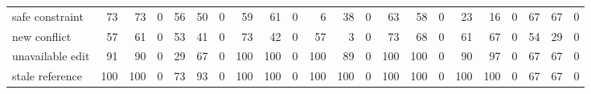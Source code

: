 \begin{tabular}{lrrrrrrrrrrrrrrrrrrrrr}
safe constraint & \cellcolor[gray]{0.74}73 & \cellcolor[gray]{0.74}73 & \cellcolor[gray]{1.00}0 & \cellcolor[gray]{0.81}56 & \cellcolor[gray]{0.82}50 & \cellcolor[gray]{1.00}0 & \cellcolor[gray]{0.79}59 & \cellcolor[gray]{0.79}61 & \cellcolor[gray]{1.00}0 & \cellcolor[gray]{0.98}6 & \cellcolor[gray]{0.87}38 & \cellcolor[gray]{1.00}0 & \cellcolor[gray]{0.78}63 & \cellcolor[gray]{0.80}58 & \cellcolor[gray]{1.00}0 & \cellcolor[gray]{0.92}23 & \cellcolor[gray]{0.95}16 & \cellcolor[gray]{1.00}0 & \cellcolor[gray]{0.77}67 & \cellcolor[gray]{0.77}67 & \cellcolor[gray]{1.00}0 \\
new conflict & \cellcolor[gray]{0.80}57 & \cellcolor[gray]{0.79}61 & \cellcolor[gray]{1.00}0 & \cellcolor[gray]{0.81}53 & \cellcolor[gray]{0.86}41 & \cellcolor[gray]{1.00}0 & \cellcolor[gray]{0.74}73 & \cellcolor[gray]{0.85}42 & \cellcolor[gray]{1.00}0 & \cellcolor[gray]{0.80}57 & \cellcolor[gray]{0.99}3 & \cellcolor[gray]{1.00}0 & \cellcolor[gray]{0.74}73 & \cellcolor[gray]{0.76}68 & \cellcolor[gray]{1.00}0 & \cellcolor[gray]{0.79}61 & \cellcolor[gray]{0.77}67 & \cellcolor[gray]{1.00}0 & \cellcolor[gray]{0.81}54 & \cellcolor[gray]{0.90}29 & \cellcolor[gray]{1.00}0 \\
unavailable edit & \cellcolor[gray]{0.68}91 & \cellcolor[gray]{0.69}90 & \cellcolor[gray]{1.00}0 & \cellcolor[gray]{0.90}29 & \cellcolor[gray]{0.77}67 & \cellcolor[gray]{1.00}0 & \cellcolor[gray]{0.65}100 & \cellcolor[gray]{0.65}100 & \cellcolor[gray]{1.00}0 & \cellcolor[gray]{0.65}100 & \cellcolor[gray]{0.69}89 & \cellcolor[gray]{1.00}0 & \cellcolor[gray]{0.65}100 & \cellcolor[gray]{0.65}100 & \cellcolor[gray]{1.00}0 & \cellcolor[gray]{0.69}90 & \cellcolor[gray]{0.66}97 & \cellcolor[gray]{1.00}0 & \cellcolor[gray]{0.77}67 & \cellcolor[gray]{0.77}67 & \cellcolor[gray]{1.00}0 \\
stale reference & \cellcolor[gray]{0.65}100 & \cellcolor[gray]{0.65}100 & \cellcolor[gray]{1.00}0 & \cellcolor[gray]{0.74}73 & \cellcolor[gray]{0.67}93 & \cellcolor[gray]{1.00}0 & \cellcolor[gray]{0.65}100 & \cellcolor[gray]{0.65}100 & \cellcolor[gray]{1.00}0 & \cellcolor[gray]{0.65}100 & \cellcolor[gray]{0.65}100 & \cellcolor[gray]{1.00}0 & \cellcolor[gray]{0.65}100 & \cellcolor[gray]{0.65}100 & \cellcolor[gray]{1.00}0 & \cellcolor[gray]{0.65}100 & \cellcolor[gray]{0.65}100 & \cellcolor[gray]{1.00}0 & \cellcolor[gray]{0.77}67 & \cellcolor[gray]{0.77}67 & \cellcolor[gray]{1.00}0 \\
\bottomrule
\end{tabular}
